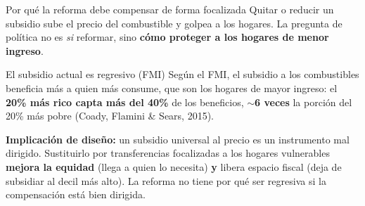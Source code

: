 \documentclass[aspectratio=169,10pt]{beamer}
\newcommand{\key}[1]{{\bfseries\color{AcentoRojo}#1}}
\begin{document}
\begin{frame}{Por qué la reforma debe compensar de forma focalizada}
  \small
  Quitar o reducir un subsidio sube el precio del combustible y golpea a los hogares. La pregunta
  de política no es \emph{si} reformar, sino \textbf{cómo proteger a los hogares de menor ingreso}.

  \begin{block}{El subsidio actual es regresivo (FMI)}
    Según el FMI, el subsidio a los combustibles beneficia más a quien más consume, que son los
    hogares de mayor ingreso: el \key{20\% más rico capta más del 40\%} de los beneficios,
    \textbf{$\sim$6 veces} la porción del 20\% más pobre (Coady, Flamini \& Sears, 2015).
  \end{block}

  \textbf{Implicación de diseño:} un subsidio universal al precio es un instrumento mal dirigido.
  Sustituirlo por \alert{transferencias focalizadas} a los hogares vulnerables \textbf{mejora la
  equidad} (llega a quien lo necesita) \textbf{y} libera espacio fiscal (deja de subsidiar al
  decil más alto). La reforma no tiene por qué ser regresiva si la compensación está bien dirigida.

\end{frame}
\end{document}
